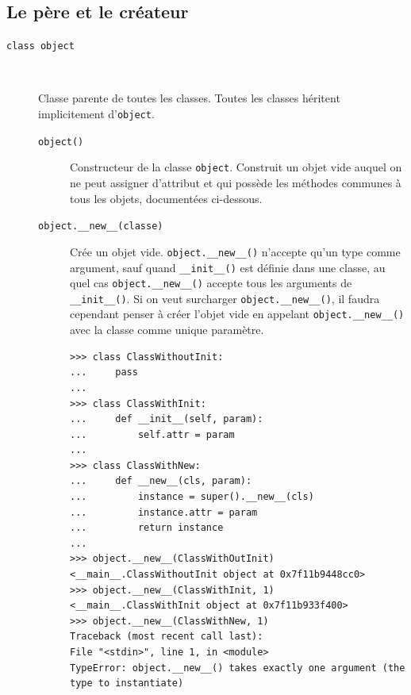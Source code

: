 \documentclass[a4paper, 10pt]{article}
\begin{document}
\subsection{Le père et le créateur}

\begin{description}
    \item[\texttt{class object}]~
    
    Classe parente de toutes les classes. Toutes les classes héritent implicitement d'\texttt{object}.
    
    \begin{description}
        \item[\texttt{object()}] Constructeur de la classe \texttt{object}. Construit un objet vide auquel on ne peut assigner d'attribut et qui possède les méthodes communes à tous les objets, documentées ci-dessous.
        \item[\texttt{object.__new__(classe)}] Crée un objet vide. \texttt{object.__new__()} n'accepte qu'un type comme argument, sauf quand \texttt{__init__()} est définie dans une classe, au quel cas \texttt{object.__new__()} accepte tous les arguments de \texttt{__init__()}. Si on veut surcharger \texttt{object.__new__()}, il faudra cependant penser à créer l'objet vide en appelant \texttt{object.__new__()} avec la classe comme unique paramètre.
        
        \begin{verbatim}
>>> class ClassWithoutInit:
...     pass
...
>>> class ClassWithInit:
...     def __init__(self, param):
...         self.attr = param
...
>>> class ClassWithNew:
...     def __new__(cls, param):
...         instance = super().__new__(cls)
...         instance.attr = param
...         return instance
...
>>> object.__new__(ClassWithOutInit)
<__main__.ClassWithoutInit object at 0x7f11b9448cc0>
>>> object.__new__(ClassWithInit, 1)
<__main__.ClassWithInit object at 0x7f11b933f400>
>>> object.__new__(ClassWithNew, 1)
Traceback (most recent call last):
File "<stdin>", line 1, in <module>
TypeError: object.__new__() takes exactly one argument (the type to instantiate)


\end{verbatim}
\end{description}
\end{description}
\end{document}
